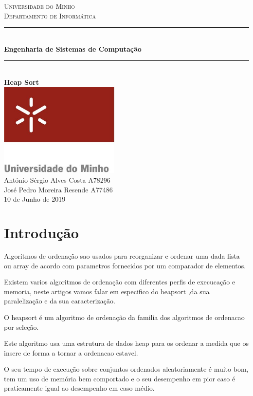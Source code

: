 \documentclass{article}
\begin{document}
\begin{titlepage}

  \newcommand{\HRule}{\rule{\linewidth}{0.5mm}} %

  \center %

  \textsc{\large Universidade do Minho}\\[0.5cm] %
  \textsc{\large Departamento de Informática}\\[2cm] %

  \HRule \\[0.4cm]
  { \huge \bfseries Engenharia de Sistemas de Computação}\\[0.4cm] %
  \HRule \\[1cm]

  { \Huge \bfseries Heap Sort}\\[0.4cm]
  \includegraphics[width=6cm]{logo.png}
  \\[4cm]

  \Large
  António Sérgio Alves Costa \textsc{A78296}\\
  José Pedro Moreira Resende \textsc{A77486}\\[2cm]

  \large 10 de Junho de 2019

\end{titlepage}

\tableofcontents

\newpage

\section{Introdução} 
\par Algoritmos de ordenação sao usados para reorganizar e ordenar uma dada lista ou array de acordo com parametros fornecidos por um comparador de elementos.
\par Existem varios algoritmos de ordenação com diferentes perfis de execucação e memoria, neste artigos vamos falar em especifico do heapsort ,da sua paralelização e da sua caracterização.
\par O heapsort é um algoritmo de ordenação da familia dos algoritmos de ordenacao por seleção. 
\par Este algoritmo usa uma estrutura de dados heap para os ordenar a medida que os insere de forma a tornar a ordenacao estavel. 
\par O seu tempo de execução sobre conjuntos ordenados aleatoriamente é muito bom, tem um uso de memória bem comportado e o seu desempenho em pior caso é praticamente igual ao desempenho em caso médio.
\end{document}
